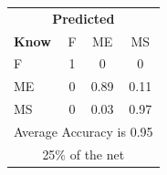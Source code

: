 \documentclass[12pt]{article} %
\begin{document}
\begin{minipage}{0.5\textwidth}
\begin{center}
\begin{tabular}{l|c|c|c|}
 \multicolumn{4}{c}{ \textbf{ Predicted}}\\
 \textbf{Know}&F&ME&MS\\ \hline\hline
F   &1&0&0\\
ME &0&0.89&0.11\\
MS &0&0.03&0.97\\
\multicolumn{4}{c}{Average Accuracy is 0.95}\\
\multicolumn{4}{c}{25\%  of the net}\\
\end{tabular}
\end{center}
\end{minipage}
\end{document}
